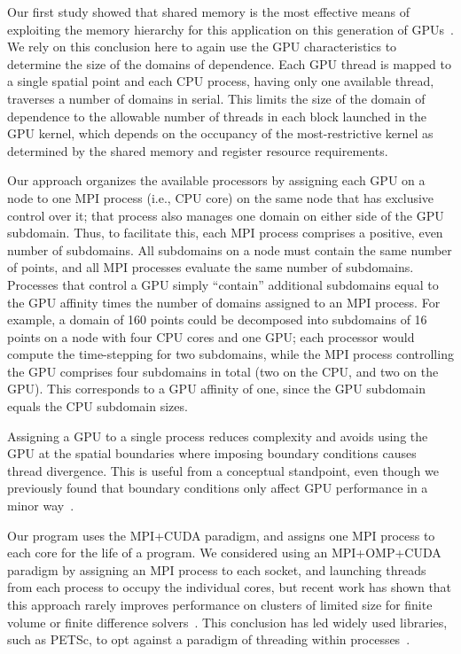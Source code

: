 Our first study showed that shared memory is the most effective means of exploiting the memory hierarchy
for this application on this generation of GPUs~\cite{OurJCP}.
We rely on this conclusion here to again use the GPU characteristics to determine the size of the
domains of dependence.
Each GPU thread is mapped to a single spatial point and each CPU process, having only one available thread,
traverses a number of domains in serial.
This limits the size of the domain of dependence to the allowable number of threads in each block launched
in the GPU kernel, which depends on the occupancy of the most-restrictive kernel as determined by the shared
memory and register resource requirements.


Our approach organizes the available processors by assigning each GPU on a node to one
MPI process (i.e., CPU core) on the same node that has exclusive control over it; that process also
manages one domain on either side of the GPU subdomain.
Thus, to facilitate this, each MPI process comprises a positive, even number of subdomains.
All subdomains on a node must contain the same number of points, and all MPI processes evaluate the
same number of subdomains.
Processes that control a GPU simply ``contain'' additional subdomains equal to the GPU affinity times
the number of domains assigned to an MPI process.
For example, a domain of 160 points could be decomposed into subdomains of 16 points on a node with
four CPU cores and one GPU; each processor would compute the time-stepping for two subdomains, while the
MPI process controlling the GPU comprises four subdomains in total (two on the CPU, and two on the GPU).
This corresponds to a GPU affinity of one, since the GPU subdomain equals the CPU subdomain sizes.

Assigning a GPU to a single process reduces complexity and avoids using the GPU at the spatial
boundaries where imposing boundary conditions causes thread divergence.
This is useful from a conceptual standpoint, even though we previously found that boundary
conditions only affect GPU performance in a minor way~\cite{OurJCP}.

Our program uses the MPI\allowbreak+CUDA paradigm, and assigns one MPI process to each core for the life of a program.
We considered using an MPI\allowbreak+OMP\allowbreak+CUDA paradigm by assigning an MPI process to each socket, and
launching threads from each process to occupy the individual cores, but recent work has shown that
this approach rarely improves performance on clusters of limited size for finite volume or finite
difference solvers~\cite{IDAHO_MPI_CUDA, PerfAnalysisHetero}.
This conclusion has led widely used libraries, such as PETSc, to opt against a paradigm of threading
within processes~\cite{MillsPetsc}.
